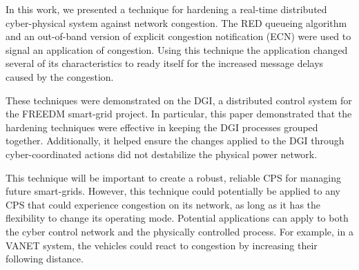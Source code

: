 
In this work, we presented a technique for hardening a real-time distributed cyber-physical system against network congestion.
The \ac{RED} queueing algorithm and an out-of-band version of explicit congestion notification (ECN) were used to signal an application of congestion.
Using this technique the application changed several of its characteristics to ready itself for the increased message delays caused by the congestion.

These techniques were demonstrated on the \ac{DGI}, a distributed control system for the \ac{FREEDM} smart-grid project.
In particular, this paper demonstrated that the hardening techniques were effective in keeping the \ac{DGI} processes grouped together.
Additionally, it helped ensure the changes applied to the \ac{DGI} through cyber-coordinated actions did not destabilize the physical power network.

This technique will be important to create a robust, reliable \ac{CPS} for managing future smart-grids.
However, this technique could potentially be applied to any \ac{CPS} that could experience congestion on its network, as long as it has the flexibility to change its operating mode.
Potential applications can apply to both the cyber control network and the physically controlled process.
For example, in a VANET system, the vehicles could react to congestion by increasing their following distance.
